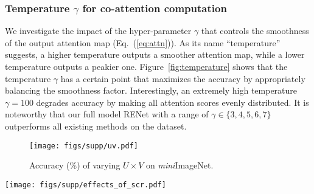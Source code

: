 \documentclass[10pt,twocolumn,letterpaper]{article}
\newcommand{\itmini}{\textit{mini}}
\newcommand{\ours}{RENet\xspace}
\newcommand{\abbself}{SCR\xspace}
\newcommand{\abbcross}{CCA\xspace}
\begin{document}
\subsubsection{Temperature $\gamma$ for co-attention computation}
We investigate the impact of the hyper-parameter $\gamma$ that controls the smoothness of the output attention map (Eq.~(\ref{eq:attn})).
As its name ``temperature'' suggests, a higher temperature outputs a smoother attention map, while a lower temperature outputs a peakier one.
Figure~\ref{fig:temperature} shows that the temperature $\gamma$ has a certain point that maximizes the accuracy by appropriately balancing the smoothness factor.
Interestingly, an extremely high temperature $\gamma = 100$ degrades accuracy by making all attention scores evenly distributed.
It is noteworthy that our full model \ours with a range of $\gamma \in \{3, 4, 5, 6, 7\}$ outperforms all existing methods on the dataset.







\begin{figure}[t!]
\centering
\texttt{[image: figs/supp/uv.pdf]}
\vspace{-2mm}
\caption{Accuracy (\%) of varying $U \times V$ on \itmini ImageNet.
\label{fig:uv}}
\vspace{-2mm}
\end{figure} 

















\begin{figure*}[t!]
\centering
\texttt{[image: figs/supp/effects\_of\_scr.pdf]}
\caption{\textbf{Effects of \abbself on \itmini ImageNet}.
``\abbcross w/ \abbself'' captures fine details between two images while ``\abbcross w/o \abbself'' often fails.
The ``base feature map'' and ``\abbself'' columns visualize average channel activations.
The ``\abbcross w/ \abbself'' and ``\abbcross w/o \abbself'' columns visualize co-attention maps.
\label{fig:effects_of_scr}}
\vspace{-2mm}
\end{figure*} 
\end{document}
